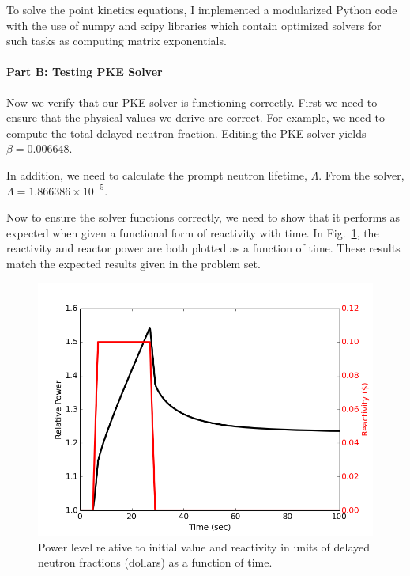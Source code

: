 \documentclass[12pt]{report}
\begin{document}
	To solve the point kinetics equations, I implemented a modularized Python code with the use of numpy and scipy libraries which contain optimized solvers for such tasks as computing matrix exponentials. 
	
	\paragraph{Part B: Testing PKE Solver}
	Now we verify that our PKE solver is functioning correctly. First we need to ensure that the physical values we derive are correct. For example, we need to compute the total delayed neutron fraction. Editing the PKE solver yields $\boxed{ \beta = 0.006648}$.
	
	In addition, we need to calculate the prompt neutron lifetime, $\Lambda$. From the solver, $\boxed{\Lambda = 1.866386 \times 10^{-5}}$.
	
	Now to ensure the solver functions correctly, we need to show that it performs as expected when given a functional form of reactivity with time. In Fig.~\ref{pke}, the reactivity and reactor power are both plotted as a function of time. These results match the expected results given in the problem set.
	
	\begin{figure}[h!]
		\begin{center}
			\includegraphics[scale=0.7]{partB.png}
		\end{center}
		\caption{Power level relative to initial value and reactivity in units of delayed neutron fractions (dollars) as a function of time.}
		\label{pke}
	\end{figure}
	
\end{document}
